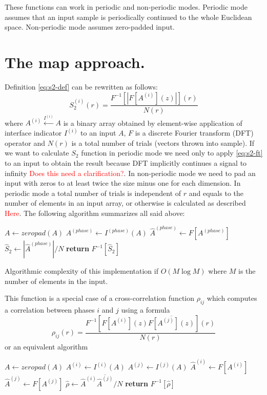 \documentclass[reprint,amsmath,amssymb,aps,pre,showkeys,showpacs,nofootinbib]{revtex4-1}
\begin{document}
These functions can work in periodic and non-periodic modes. Periodic mode
assumes that an input sample is periodically continued to the whole Euclidean
space. Non-periodic mode assumes zero-padded input.

\section{The map approach.}
\label{sec:map}
Definition \cref{eq:s2-def} can be rewritten as follows:
\begin{equation}
  S_2^{(i)}(r) = \frac{F^{-1} [|F [A^{(i)}](z)|] (r)}{N(r)} \label{eq:s2-ft}
\end{equation}
where $A^{(i)} \xleftarrow{I^{(i)}} A$ is a binary array obtained by element-wise
application of interface indicator $I^{(i)}$ to an input $A$, $F$ is a discrete
Fourier transform (DFT) operator and $N(r)$ is a total number of trials (vectors
thrown into sample). If we want to calculate $S_2$ function in periodic mode we
need only to apply \cref{eq:s2-ft} to an input to obtain the result because DFT
implicitly continues a signal to infinity \textcolor{red}{Does this need a
clarification?}. In non-periodic mode we need to pad an input with zeros to at
least twice the size minus one for each dimension. In periodic mode a total
number of trials is independent of $r$ and equals to the number of elements in
an input array, or otherwise is calculated as described
\textcolor{red}{Here}. The following algorithm summarizes all said above:
\begin{algorithmic}[1]
    \State $A \gets zeropad(A)$
  \EndIf
  \State $A^{(phase)} \gets I^{(phase)} (A)$
  \State $\hat{A}^{(phase)} \gets F[A^{(phase)}]$
  \State $\hat{S}_2 \gets |\hat{A}^{(phase)}| / N$
  \State \textbf{return} $F^{-1} [\hat{S}_2]$
  \EndProcedure
\end{algorithmic}
Algorithmic complexity of this implementation if $O(M \log M)$ where $M$ is the
number of elements in the input.

This function is a special case of a cross-correlation function $\rho_{ij}$
which computes a correlation between phases $i$ and $j$ using a formula
\begin{equation}
  \rho_{ij}(r) = \frac{F^{-1} [F[A^{(i)}](z) \overline{F[A^{(j)}](z)}] (r)}{N(r)} \label{eq:cross-ft}
\end{equation}
or an equivalent algorithm
\begin{algorithmic}[1]
    \State $A \gets zeropad(A)$
  \EndIf
  \State $A^{(i)} \gets I^{(i)} (A)$
  \State $A^{(j)} \gets I^{(j)} (A)$
  \State $\hat{A}^{(i)} \gets F[A^{(i)}]$
  \State $\hat{A}^{(j)} \gets F[A^{(j)}]$
  \State $\hat{\rho} \gets \hat{A}^{(i)} \overline{\hat{A}^{(j)}} / N$
  \State \textbf{return} $F^{-1} [\hat{\rho}]$
  \EndProcedure
\end{algorithmic}
\end{document}
